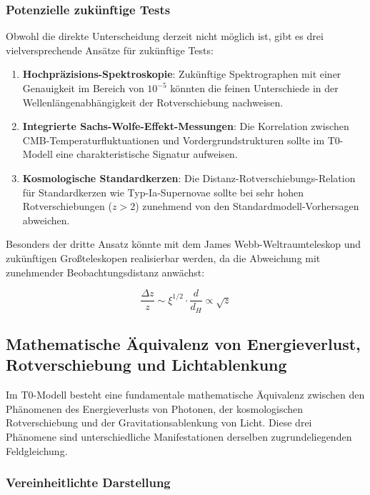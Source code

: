 \documentclass[12pt,a4paper]{article}
\theoremstyle{definition}
\begin{document}
\subsubsection{Potenzielle zukünftige Tests}

Obwohl die direkte Unterscheidung derzeit nicht möglich ist, gibt es drei vielversprechende Ansätze für zukünftige Tests:

\begin{enumerate}
	\item \textbf{Hochpräzisions-Spektroskopie}: Zukünftige Spektrographen mit einer Genauigkeit im Bereich von $10^{-5}$ könnten die feinen Unterschiede in der Wellenlängenabhängigkeit der Rotverschiebung nachweisen.
	
	\item \textbf{Integrierte Sachs-Wolfe-Effekt-Messungen}: Die Korrelation zwischen CMB-Temperaturfluktuationen und Vordergrundstrukturen sollte im T0-Modell eine charakteristische Signatur aufweisen.
	
	\item \textbf{Kosmologische Standardkerzen}: Die Distanz-Rotverschiebungs-Relation für Standardkerzen wie Typ-Ia-Supernovae sollte bei sehr hohen Rotverschiebungen ($z > 2$) zunehmend von den Standardmodell-Vorhersagen abweichen.
\end{enumerate}

Besonders der dritte Ansatz könnte mit dem James Webb-Weltraumteleskop und zukünftigen Großteleskopen realisierbar werden, da die Abweichung mit zunehmender Beobachtungsdistanz anwächst:

\begin{equation}
	\frac{\Delta z}{z} \sim \xi^{1/2} \cdot \frac{d}{d_H} \propto \sqrt{z}
\end{equation}\subsection{Mathematische Äquivalenz von Energieverlust, Rotverschiebung und Lichtablenkung}

Im T0-Modell besteht eine fundamentale mathematische Äquivalenz zwischen den Phänomenen des Energieverlusts von Photonen, der kosmologischen Rotverschiebung und der Gravitationsablenkung von Licht. Diese drei Phänomene sind unterschiedliche Manifestationen derselben zugrundeliegenden Feldgleichung.

\subsubsection{Vereinheitlichte Darstellung}
\end{document}
